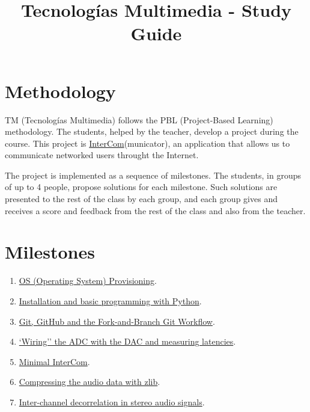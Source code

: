 \title{Tecnologías Multimedia - Study Guide}

\maketitle

\section{Methodology}
TM (Tecnologías Multimedia) follows the PBL (Project-Based Learning) methodology. The students,
helped by the teacher, develop a project during the course. This
project
is \href{https://github.com/Tecnologias-multimedia/intercom}{InterCom}(municator),
an application that allows us to communicate networked users throught
the Internet.

The project is implemented as a sequence of milestones. The students,
in groups of up to 4 people, propose solutions for each
milestone. Such solutions are presented to the rest of the class by
each group, and each group gives and receives a score and feedback
from the rest of the class and also from the teacher.

\section{Milestones}
\begin{enumerate}
\item \href{https://tecnologias-multimedia.github.io/study_guide/milestone00/}{OS (Operating System) Provisioning}.
\item \href{https://tecnologias-multimedia.github.io/study_guide/milestone01/}{Installation and basic programming with Python}.
\item \href{https://tecnologias-multimedia.github.io/study_guide/milestone02/}{Git, GitHub and the Fork-and-Branch Git Workflow}.
\item \href{https://tecnologias-multimedia.github.io/study_guide/milestone03/}{`Wiring'' the ADC with the DAC and measuring latencies}.
\item \href{https://tecnologias-multimedia.github.io/study_guide/milestone04/}{Minimal InterCom}.
\item \href{https://tecnologias-multimedia.github.io/study_guide/milestone05/}{Compressing the audio data with zlib}.
\item \href{https://tecnologias-multimedia.github.io/study_guide/milestone06/}{Inter-channel decorrelation in stereo audio signals}.
\end{enumerate}

